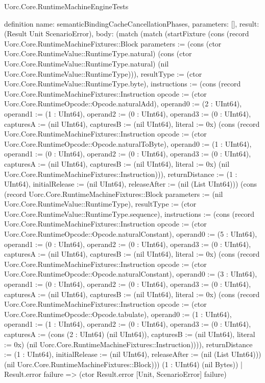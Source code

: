 \begin{lexlean}{Uorc.Core.RuntimeMachineEngineTests}
\begin{semanticmodule}
definition{
  name: semanticBindingCacheCancellationPhases,
  parameters: [],
  result: (Result Unit ScenarioError),
  body: (match (match (startFixture (cons (record Uorc.Core.RuntimeMachineFixtures::Block {parameters := (cons (ctor Uorc.Core.RuntimeValue::RuntimeType.natural) (cons (ctor Uorc.Core.RuntimeValue::RuntimeType.natural) (nil Uorc.Core.RuntimeValue::RuntimeType))), resultType := (ctor Uorc.Core.RuntimeValue::RuntimeType.byte), instructions := (cons (record Uorc.Core.RuntimeMachineFixtures::Instruction {opcode := (ctor Uorc.Core.RuntimeOpcode::Opcode.naturalAdd), operand0 := (2 : UInt64), operand1 := (1 : UInt64), operand2 := (0 : UInt64), operand3 := (0 : UInt64), capturesA := (nil UInt64), capturesB := (nil UInt64), literal := 0x}) (cons (record Uorc.Core.RuntimeMachineFixtures::Instruction {opcode := (ctor Uorc.Core.RuntimeOpcode::Opcode.naturalToByte), operand0 := (1 : UInt64), operand1 := (0 : UInt64), operand2 := (0 : UInt64), operand3 := (0 : UInt64), capturesA := (nil UInt64), capturesB := (nil UInt64), literal := 0x}) (nil Uorc.Core.RuntimeMachineFixtures::Instruction))), returnDistance := (1 : UInt64), initialRelease := (nil UInt64), releaseAfter := (nil (List UInt64))}) (cons (record Uorc.Core.RuntimeMachineFixtures::Block {parameters := (nil Uorc.Core.RuntimeValue::RuntimeType), resultType := (ctor Uorc.Core.RuntimeValue::RuntimeType.sequence), instructions := (cons (record Uorc.Core.RuntimeMachineFixtures::Instruction {opcode := (ctor Uorc.Core.RuntimeOpcode::Opcode.naturalConstant), operand0 := (5 : UInt64), operand1 := (0 : UInt64), operand2 := (0 : UInt64), operand3 := (0 : UInt64), capturesA := (nil UInt64), capturesB := (nil UInt64), literal := 0x}) (cons (record Uorc.Core.RuntimeMachineFixtures::Instruction {opcode := (ctor Uorc.Core.RuntimeOpcode::Opcode.naturalConstant), operand0 := (3 : UInt64), operand1 := (0 : UInt64), operand2 := (0 : UInt64), operand3 := (0 : UInt64), capturesA := (nil UInt64), capturesB := (nil UInt64), literal := 0x}) (cons (record Uorc.Core.RuntimeMachineFixtures::Instruction {opcode := (ctor Uorc.Core.RuntimeOpcode::Opcode.tabulate), operand0 := (1 : UInt64), operand1 := (1 : UInt64), operand2 := (0 : UInt64), operand3 := (0 : UInt64), capturesA := (cons (2 : UInt64) (nil UInt64)), capturesB := (nil UInt64), literal := 0x}) (nil Uorc.Core.RuntimeMachineFixtures::Instruction)))), returnDistance := (1 : UInt64), initialRelease := (nil UInt64), releaseAfter := (nil (List UInt64))}) (nil Uorc.Core.RuntimeMachineFixtures::Block))) (1 : UInt64) (nil Bytes))
      | Result.error failure => (ctor Result.error [Unit, ScenarioError] failure)
}
\end{semanticmodule}
\end{lexlean}
